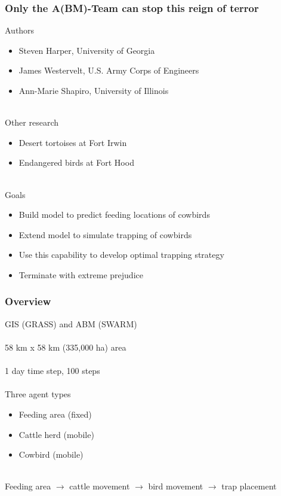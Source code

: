 \documentclass{beamer}
\begin{document}
\begin{frame}
	\frametitle{Only the A(BM)-Team can stop this reign of terror}
		Authors
			\begin{itemize}
				\item \small Steven Harper, University of Georgia
				\item \small James Westervelt, U.S. Army Corps of Engineers
				\item \small Ann-Marie Shapiro, University of Illinois
					\\~\\
			\end{itemize}
		Other research
			\begin{itemize}
				\item \small Desert tortoises at Fort Irwin
				\item \small Endangered birds at Fort Hood \\~\\
			\end{itemize}

		Goals
			\begin{itemize}
				\item \small Build model to predict feeding locations of cowbirds
				\item \small Extend model to simulate trapping of cowbirds
				\item \small Use this capability to develop optimal trapping strategy
				\item \small Terminate with extreme prejudice
			\end{itemize}
\end{frame}

\begin{frame}
	\frametitle{Overview}
	GIS (GRASS) and ABM (SWARM) \\~\\

	58 km x 58 km (335,000 ha) area \\~\\

	1 day time step, 100 steps \\~\\

	Three agent types
	\begin{itemize}
		\item \small Feeding area (fixed)
		\item \small Cattle herd (mobile)
		\item \small Cowbird (mobile) \\~\\
	\end{itemize}

	Feeding area $\to$ cattle movement $\to$ bird movement $\to$ trap placement

\end{frame}
\end{document}
